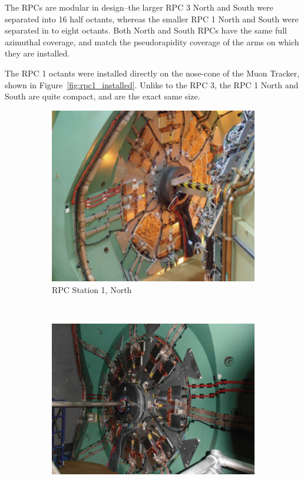 The RPCs are modular in design--the larger RPC 3 North and South were separated
into 16 half octants, whereas the smaller RPC 1 North and South were separated
in to eight octants. Both North and South RPCs have the same full azimuthal
coverage, and match the pseudorapidity coverage of the arms on which they are
installed.

The RPC 1 octants were installed directly on the nose-cone of the Muon Tracker,
shown in Figure~\ref{fig:rpc1_installed}. Unlike to the RPC 3, the RPC 1 North
and South are quite compact, and are the exact same size.


\begin{figure}
  \centering
  \begin{subfigure}[b]{0.5\textwidth}
    \centering
    \includegraphics[width=\linewidth]{./figures/rpc1_north_installed}
    \caption{RPC Station 1, North}
    \label{fig:rpc1n}
  \end{subfigure}%
  ~
  \begin{subfigure}[b]{0.5\textwidth}
    \centering
    \includegraphics[width=\linewidth]{./figures/rpc1_south_installed}

\end{subfigure}
\end{figure}
